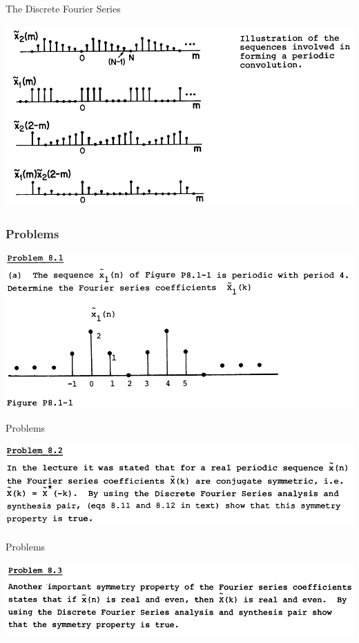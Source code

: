 \documentclass[pdflatex,compress,mathserif]{beamer}
\begin{document}
\begin{frame}{The Discrete Fourier Series}
	\begin{center}
		\includegraphics[width=\linewidth]{img/img04}
	\end{center}
\end{frame}

\begin{frame}
	\frametitle{Problems}
	\begin{center}
		\includegraphics[width=\linewidth]{img/img05}
	\end{center}
\end{frame}

\begin{frame}{Problems}
	\begin{center}
		\includegraphics[width=\linewidth]{img/img06}
	\end{center}
\end{frame}

\begin{frame}{Problems}
	\begin{center}
		\includegraphics[width=\linewidth]{img/img07}
	\end{center}
\end{frame}
\end{document}
